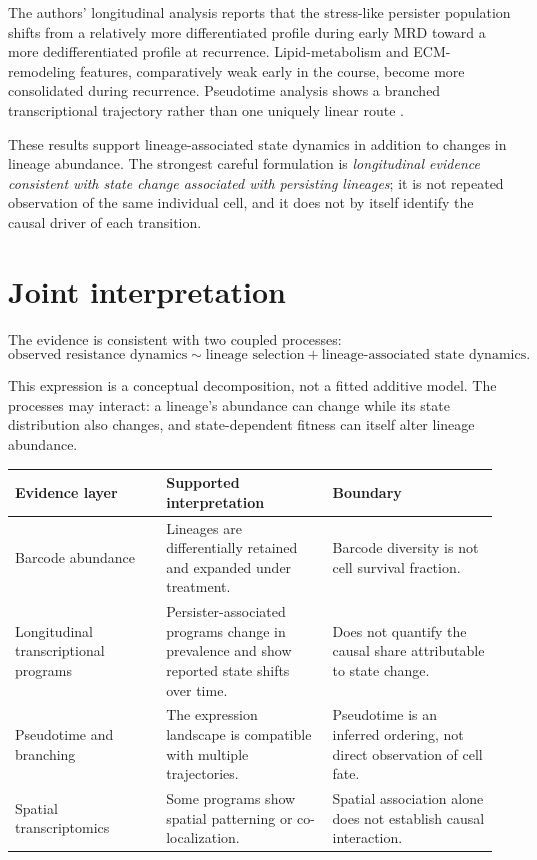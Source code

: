 \documentclass[11pt]{article}
\begin{document}
The authors' longitudinal analysis reports that the stress-like persister population shifts from a relatively more differentiated profile during early MRD toward a more dedifferentiated profile at recurrence. Lipid-metabolism and ECM-remodeling features, comparatively weak early in the course, become more consolidated during recurrence. Pseudotime analysis shows a branched transcriptional trajectory rather than one uniquely linear route \cite{Li2026}.

These results support lineage-associated state dynamics in addition to changes in lineage abundance. The strongest careful formulation is \emph{longitudinal evidence consistent with state change associated with persisting lineages}; it is not repeated observation of the same individual cell, and it does not by itself identify the causal driver of each transition.

\section{Joint interpretation}

The evidence is consistent with two coupled processes:
\[
\text{observed resistance dynamics}
\sim
\text{lineage selection}
+
\text{lineage-associated state dynamics}.
\]

This expression is a conceptual decomposition, not a fitted additive model. The processes may interact: a lineage's abundance can change while its state distribution also changes, and state-dependent fitness can itself alter lineage abundance.

\begin{center}
\begin{tabular}{p{0.30\linewidth}p{0.33\linewidth}p{0.33\linewidth}}
\toprule
\textbf{Evidence layer} & \textbf{Supported interpretation} & \textbf{Boundary} \\
\midrule
Barcode abundance & Lineages are differentially retained and expanded under treatment. & Barcode diversity is not cell survival fraction. \\
Longitudinal transcriptional programs & Persister-associated programs change in prevalence and show reported state shifts over time. & Does not quantify the causal share attributable to state change. \\
Pseudotime and branching & The expression landscape is compatible with multiple trajectories. & Pseudotime is an inferred ordering, not direct observation of cell fate. \\
Spatial transcriptomics & Some programs show spatial patterning or co-localization. & Spatial association alone does not establish causal interaction. \\
\bottomrule
\end{tabular}
\end{center}
\end{document}
